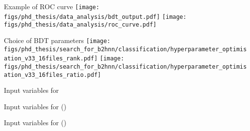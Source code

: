 \begin{frame}[noframenumbering]{Example of ROC curve}
\centering
\texttt{[image: figs/phd\_thesis/data\_analysis/bdt\_output.pdf]}
\texttt{[image: figs/phd\_thesis/data\_analysis/roc\_curve.pdf]}
\end{frame}
\begin{frame}[noframenumbering]{Choice of BDT parameters}
\centering
{}
\texttt{[image: figs/phd\_thesis/search\_for\_b2hnn/classification/hyperparameter\_optimisation\_v33\_16files\_rank.pdf]}
\texttt{[image: figs/phd\_thesis/search\_for\_b2hnn/classification/hyperparameter\_optimisation\_v33\_16files\_ratio.pdf]}
\end{frame}
\begin{frame}[noframenumbering]{Input variables for \bdto}
\centering
{}
\end{frame}
\begin{frame}[noframenumbering]{Input variables for \bdtt (\BKpnn)}
\centering
{}
\end{frame}
\begin{frame}[noframenumbering]{Input variables for \bdtt (\BKznn)}
\centering
{}
\end{frame}
